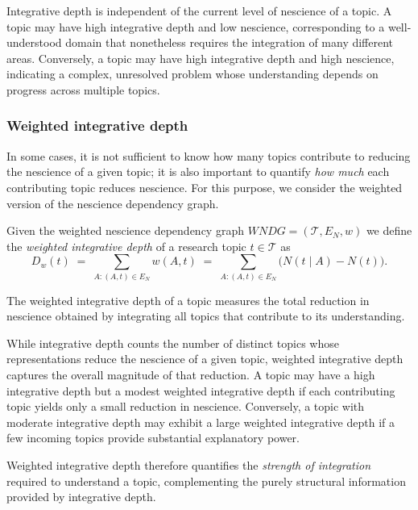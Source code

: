 Integrative depth is independent of the current level of nescience of a topic. A topic may have high integrative depth and low nescience, corresponding to a well-understood domain that nonetheless requires the integration of many different areas. Conversely, a topic may have high integrative depth and high nescience, indicating a complex, unresolved problem whose understanding depends on progress across multiple topics.


\subsubsection*{Weighted integrative depth}
\label{subsec:weighted_integrative_depth}

In some cases, it is not sufficient to know how many topics contribute to reducing the nescience of a given topic; it is also important to quantify \emph{how much} each contributing topic reduces nescience. For this purpose, we consider the weighted version of the nescience dependency graph.

\begin{definition}
Given the weighted nescience dependency graph $WNDG = (\mathcal{T}, E_N, w)$ we define the \emph{weighted integrative depth} of a research topic $t \in \mathcal{T}$ as 
\[
D_w(t) \;=\; \sum_{A : (A,t) \in E_N} w(A,t)
\;=\; \sum_{A : (A,t) \in E_N} \bigl( N(t \mid A) - N(t) \bigr).
\]
\end{definition}

\noindent
The weighted integrative depth of a topic measures the total reduction in nescience obtained by integrating all topics that contribute to its understanding.

While integrative depth counts the number of distinct topics whose representations reduce the nescience of a given topic, weighted integrative depth captures the overall magnitude of that reduction. A topic may have a high integrative depth but a modest weighted integrative depth if each contributing topic yields only a small reduction in nescience. Conversely, a topic with moderate integrative depth may exhibit a large weighted integrative depth if a few incoming topics provide substantial explanatory power.

Weighted integrative depth therefore quantifies the \emph{strength of integration} required to understand a topic, complementing the purely structural information provided by integrative depth.


